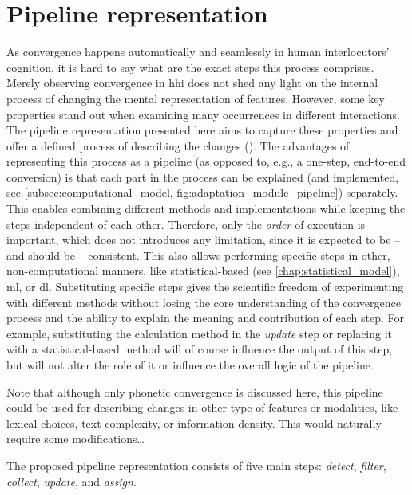 \section{Pipeline representation}
\label{sec:pipeline_representation}

As convergence happens automatically and seamlessly in human interlocutors' cognition, it is hard to say what are the exact steps this process comprises.
Merely observing convergence in \ac{hhi} does not shed any light on the internal process of changing the mental representation of features.
However, some key properties stand out when examining many occurrences in different interactions.
The pipeline representation presented here aims to capture these properties and offer a defined process of describing the changes ().
The advantages of representing this process as a pipeline (as opposed to, e.g., a one-step, end-to-end conversion) is that each part in the process can be explained (and implemented, see \cref{subsec:computational_model, fig:adaptation_module_pipeline}) separately.
This enables combining different methods and implementations while keeping the steps independent of each other.
Therefore, only the \emph{order} of execution is important, which does not introduces any limitation, since it is expected to be -- and should be -- consistent.
This also allows performing specific steps in other, non-computational manners, like statistical-based (see \cref{chap:statistical_model}), \ac{ml}, or \ac{dl}.
Substituting specific steps gives the scientific freedom of experimenting with different methods without losing the core understanding of the convergence process and the ability to explain the meaning and contribution of each step.
For example, substituting the calculation method in the \textit{update} step or replacing it with a statistical-based method will of course influence the output of this step, but will not alter the role of it or influence the overall logic of the pipeline.

Note that although only phonetic convergence is discussed here, this pipeline could be used for describing changes in other type of features or modalities, like lexical choices, text complexity, or information density.
This would naturally require some modifications\ldots

The proposed pipeline representation consists of five main steps: \emph{detect}, \emph{filter}, \emph{collect}, \emph{update}, and \emph{assign}.

